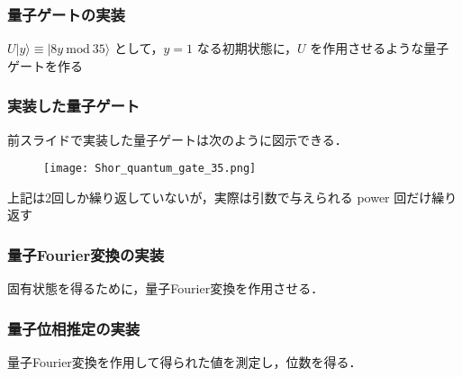 \documentclass[dvipdfmx,12pt]{beamer}
\begin{document}
\begin{frame}

\frametitle{量子ゲートの実装}

$ U | y \rangle \equiv | 8y \ \mathrm{mod} \ 35 \rangle $ として，$ y = 1 $ なる初期状態に，$ U $ を作用させるような量子ゲートを作る
   


        
\end{frame}


\begin{frame}

\frametitle{実装した量子ゲート}
    
前スライドで実装した量子ゲートは次のように図示できる．

\vspace{5pt}

\begin{figure}
    \texttt{[image: Shor\_quantum\_gate\_35.png]}
\end{figure}

上記は2回しか繰り返していないが，実際は引数で与えられる power 回だけ繰り返す

\end{frame}


\begin{frame}

\frametitle{量子Fourier変換の実装}

固有状態を得るために，量子Fourier変換を作用させる．


    
            
\end{frame}


\begin{frame}

\frametitle{量子位相推定の実装}

量子Fourier変換を作用して得られた値を測定し，位数を得る．
           

         
                
\end{frame}
\end{document}
